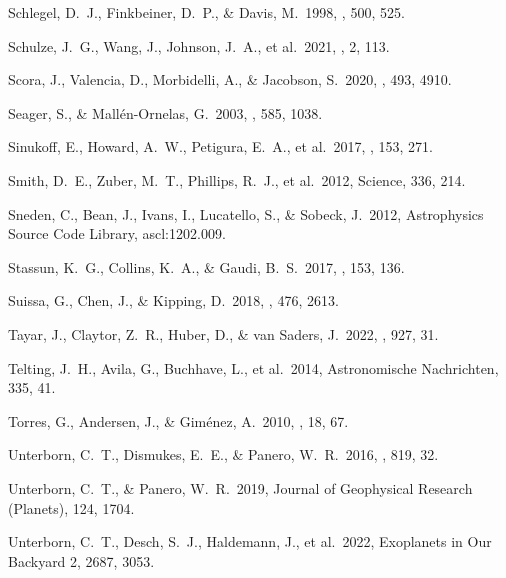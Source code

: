  Schlegel, D.~J., Finkbeiner, D.~P., \& Davis, M.\ 1998, \apj, 500, 525.

 Schulze, J.~G., Wang, J., Johnson, J.~A., et al.\ 2021, \psj, 2, 113.

 Scora, J., Valencia, D., Morbidelli, A., \& Jacobson, S.\ 2020, \mnras, 493, 4910.

 Seager, S., \& Mall{\'e}n-Ornelas, G.\ 2003, \apj, 585, 1038.

 Sinukoff, E., Howard, A.~W., Petigura, E.~A., et al.\ 2017, \aj, 153, 271.

 Smith, D.~E., Zuber, M.~T., Phillips, R.~J., et al.\ 2012, Science, 336, 214.

 Sneden, C., Bean, J., Ivans, I., Lucatello, S., \& Sobeck, J.\ 2012, Astrophysics Source Code Library, ascl:1202.009.

 Stassun, K.~G., Collins, K.~A., \& Gaudi, B.~S.\ 2017, \aj, 153, 136.

 Suissa, G., Chen, J., \& Kipping, D.\ 2018, \mnras, 476, 2613.

 Tayar, J., Claytor, Z.~R., Huber, D., \& van Saders, J.\ 2022, \apj, 927, 31.

 Telting, J.~H., Avila, G., Buchhave, L., et al.\ 2014, Astronomische Nachrichten, 335, 41.

 Torres, G., Andersen, J., \& Gim{\'e}nez, A.\ 2010, \aapr, 18, 67.

 Unterborn, C.~T., Dismukes, E.~E., \& Panero, W.~R.\ 2016, \apj, 819, 32.

 Unterborn, C.~T., \& Panero, W.~R.\ 2019, Journal of Geophysical Research (Planets), 124, 1704.

 Unterborn, C.~T., Desch, S.~J., Haldemann, J., et al.\ 2022, Exoplanets in Our Backyard 2, 2687, 3053.

